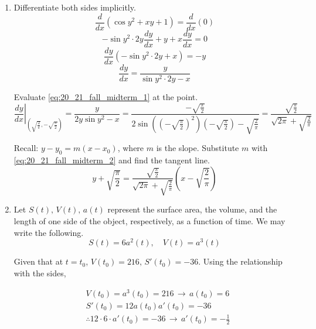 \documentclass[a4paper, 12pt]{article}
\begin{document}
\begin{enumerate}[leftmargin=*,label=\textbf{\arabic*.}]
From the left side, the limit is equal to as follows.
\[\lim_{x\to0^-}\frac{x-\cos x}{x^2}=\lim_{x\to0^-}(x-\cos x)\cdot\lim_{x\to0^-}\frac1{x^2} =-\infty\]

Continuity requires the equality of one-sided limits and the value of the function at that point. However, the one-sided limits are not equal; $0\neq-\infty$. Therefore, $f(x)$ is $\boxed{\text{discontinuous}}$ at $x=0$.

\item Differentiate both sides implicitly.
\[\frac{d}{dx}\left(\cos y^2+xy+1\right)=\frac{d}{dx}(0)\]
\[-\sin y^2\cdot2y\frac{dy}{dx}+y+x\frac{dy}{dx}=0\]
\[\frac{dy}{dx}\left(-\sin y^2\cdot2y+x\right)=-y\]
\begin{equation}\frac{dy}{dx}= \frac y{\sin y^2 \cdot 2y - x}\label{eq:20_21_fall_midterm_1}\end{equation}

Evaluate \eqref{eq:20_21_fall_midterm_1} at the point.
\begin{equation}\left.\frac{dy}{dx}\right|_{\left(\sqrt{\frac{2}{\pi}},-\sqrt{\frac{\pi}{2}}\right)} =\frac y{2y\sin y^2-x}=\frac{-\sqrt{\frac{\pi}{2}}}{2\sin\left(\left(-\sqrt{\frac{\pi}{2}}\right)^2\right)\left(-\sqrt{\frac{\pi}{2}}\right)-\sqrt{\frac{2}{\pi}}} =\frac{\sqrt{\frac{\pi}{2}}}{\sqrt{2\pi}+\sqrt{\frac{2}{\pi}}}\label{eq:20_21_fall_midterm_2}\end{equation}

Recall: $y-y_0 = m(x-x_0)$, where $m$ is the slope. Substitute $m$ with \eqref{eq:20_21_fall_midterm_2} and find the tangent line.
\[\boxed{y+\sqrt{\frac{\pi}{2}}=\frac{\displaystyle\sqrt{\frac{\pi}{2}}}{\displaystyle\sqrt{2\pi}+\sqrt{\frac{2}{\pi}}}\left(x-\sqrt{\frac{2}{\pi}}\right)}\]

\item Let $S(t),\, V(t),\, a(t)$ represent the surface area, the volume, and the length of one side of the object, respectively, as a function of time. We may write the following.
\[S(t)=6a^2(t),\quad V(t)=a^3(t)\]

Given that at $t=t_0$, $V(t_0) = 216, \,S'(t_0)=-36$. Using the relationship with the sides,

\begin{align*}
&V(t_0) = a^3(t_0)= 216\,\rightarrow\, a(t_0) = 6\\
&S'(t_0) = 12a(t_0)a'(t_0)=-36\\
&\therefore 12\cdot6\cdot a'(t_0)=-36 \,\rightarrow\, a'(t_0)=-\frac12
\end{align*}


\end{enumerate}
\end{document}
